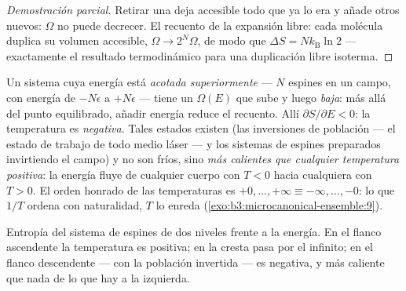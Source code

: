 \begin{proof}[Demostración parcial]
Retirar una  deja accesible todo  que ya lo era y añade
otros nuevos: $\Omega$ no puede decrecer. El recuento de la expansión
libre: cada molécula duplica su volumen accesible,
$\Omega \to 2^N\Omega$, de modo que $\Delta S = Nk_{\text{B}}\ln2$ ---
exactamente el resultado termodinámico para una duplicación libre isoterma.
\end{proof}

\begin{example}\label{ex:b3:microcanonical-ensemble:negative}
Un sistema cuya energía está \emph{acotada superiormente} --- $N$ espines en
un campo, con energía de $-N\epsilon$ a $+N\epsilon$ --- tiene un $\Omega(E)$
que sube y luego \emph{baja}: más allá del punto equilibrado, añadir energía
reduce el recuento. Allí $\partial S/\partial E < 0$: la
temperatura es \emph{negativa}. Tales estados existen (las inversiones de
población --- el estado de trabajo de todo medio láser --- y los sistemas de
espines preparados invirtiendo el campo) y no son fríos, sino \emph{más
calientes que cualquier temperatura positiva}: la energía fluye de cualquier
cuerpo con $T < 0$ hacia cualquiera con $T > 0$. El orden honrado de las
temperaturas es $+0, \dots, +\infty \equiv -\infty, \dots, -0$:
lo que $1/T$ ordena con naturalidad, $T$ lo enreda
(\cref{exo:b3:microcanonical-ensemble:9}).
\end{example}

\begin{omfigure}

{\small Entropía del sistema de espines de dos niveles frente a la energía.
En el flanco ascendente la temperatura es positiva; en la cresta pasa por
el infinito; en el flanco descendente --- con la población invertida --- es
negativa, y más caliente que nada de lo que hay a la izquierda.}
\end{omfigure}

